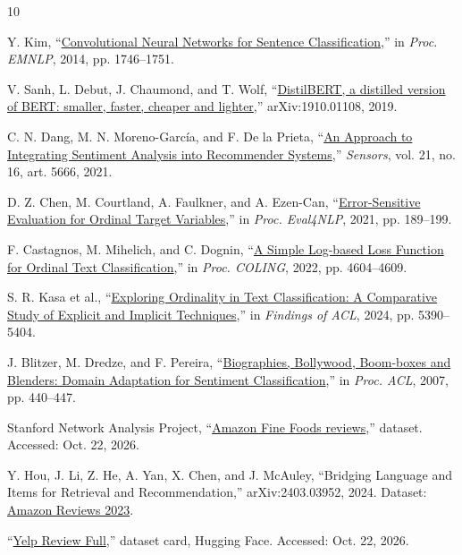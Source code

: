 \documentclass[conference,a4paper,9pt]{IEEEtran}
\begin{document}
\begin{thebibliography}{10}

Y. Kim, ``\href{https://aclanthology.org/D14-1181/}{Convolutional Neural Networks for Sentence Classification},'' in \emph{Proc. EMNLP}, 2014, pp. 1746--1751.

V. Sanh, L. Debut, J. Chaumond, and T. Wolf, ``\href{https://arxiv.org/abs/1910.01108}{DistilBERT, a distilled version of BERT: smaller, faster, cheaper and lighter},'' arXiv:1910.01108, 2019.

C. N. Dang, M. N. Moreno-Garc\'{i}a, and F. De la Prieta, ``\href{https://doi.org/10.3390/s21165666}{An Approach to Integrating Sentiment Analysis into Recommender Systems},'' \emph{Sensors}, vol. 21, no. 16, art. 5666, 2021.

D. Z. Chen, M. Courtland, A. Faulkner, and A. Ezen-Can, ``\href{https://aclanthology.org/2021.eval4nlp-1.19/}{Error-Sensitive Evaluation for Ordinal Target Variables},'' in \emph{Proc. Eval4NLP}, 2021, pp. 189--199.

F. Castagnos, M. Mihelich, and C. Dognin, ``\href{https://aclanthology.org/2022.coling-1.407/}{A Simple Log-based Loss Function for Ordinal Text Classification},'' in \emph{Proc. COLING}, 2022, pp. 4604--4609.

S. R. Kasa et al., ``\href{https://aclanthology.org/2024.findings-acl.320/}{Exploring Ordinality in Text Classification: A Comparative Study of Explicit and Implicit Techniques},'' in \emph{Findings of ACL}, 2024, pp. 5390--5404.

J. Blitzer, M. Dredze, and F. Pereira, ``\href{https://aclanthology.org/P07-1056/}{Biographies, Bollywood, Boom-boxes and Blenders: Domain Adaptation for Sentiment Classification},'' in \emph{Proc. ACL}, 2007, pp. 440--447.

Stanford Network Analysis Project, ``\href{https://snap.stanford.edu/data/web-FineFoods.html}{Amazon Fine Foods reviews},'' dataset. Accessed: Oct. 22, 2026.

Y. Hou, J. Li, Z. He, A. Yan, X. Chen, and J. McAuley, ``Bridging Language and Items for Retrieval and Recommendation,'' arXiv:2403.03952, 2024. Dataset: \href{https://amazon-reviews-2023.github.io/}{Amazon Reviews 2023}.

``\href{https://huggingface.co/datasets/Yelp/yelp_review_full}{Yelp Review Full},'' dataset card, Hugging Face. Accessed: Oct. 22, 2026.

\end{thebibliography}
\end{document}
